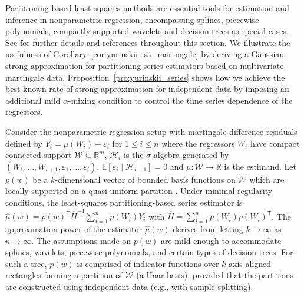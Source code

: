 \documentclass[11pt,lof]{puthesis}
\newcommand{\R}{\ensuremath{\mathbb{R}}}
\newcommand{\E}{\ensuremath{\mathbb{E}}}
\newcommand{\cH}{\ensuremath{\mathcal{H}}}
\newcommand{\cW}{\ensuremath{\mathcal{W}}}
\newcommand{\T}{\ensuremath{\mathsf{T}}}
\theoremstyle{break}
\theoremstyle{proof}
\begin{document}
Partitioning-based least squares methods are essential tools for estimation and
inference in nonparametric regression, encompassing splines, piecewise
polynomials, compactly supported wavelets and decision trees as special cases.
See \citet{cattaneo2020large} for further details and references throughout
this section. We illustrate the usefulness of
Corollary~\ref{cor:yurinskii_sa_martingale}
by deriving a Gaussian strong approximation for partitioning series estimators
based on multivariate martingale data. Proposition~\ref{pro:yurinskii_series}
shows how
we achieve the best known rate of strong approximation for independent data by
imposing an additional mild $\alpha$-mixing condition to control the time
series dependence of the regressors.

Consider the nonparametric regression setup with martingale difference
residuals defined by $Y_i = \mu(W_i) + \varepsilon_i$ for $ 1 \leq i \leq n$
where the regressors $W_i$ have compact connected support $\cW \subseteq \R^m$,
$\cH_i$ is the $\sigma$-algebra generated by
$(W_1, \ldots, W_{i+1}, \varepsilon_1, \ldots, \varepsilon_i)$,
$\E[\varepsilon_i \mid \cH_{i-1}] = 0$ and $\mu: \cW \to \R$ is the estimand.
Let $p(w)$ be a $k$-dimensional vector of bounded basis functions on $\cW$
which are locally supported on a quasi-uniform partition
\citep[Assumption~2]{cattaneo2020large}. Under minimal regularity conditions,
the least-squares partitioning-based series estimator is
$\hat\mu(w) = p(w)^{\T} \hat H^{-1} \sum_{i=1}^n p(W_i) Y_i$
with $\hat H = \sum_{i=1}^n p(W_i) p(W_i)^\T$.
The approximation power of the estimator $\hat\mu(w)$ derives from letting
$k\to\infty$ as $n\to\infty$. The assumptions made on $p(w)$ are mild enough to
accommodate splines, wavelets, piecewise polynomials, and certain types of
decision trees. For such a tree, $p(w)$ is comprised of indicator functions
over $k$ axis-aligned rectangles forming a partition of $\cW$ (a Haar basis),
provided that the partitions are constructed using independent data
(e.g., with sample splitting).
\end{document}
